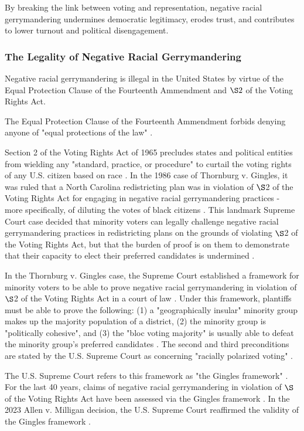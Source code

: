 \documentclass[sn-vancouver,Numbered]{sn-jnl}
\theoremstyle{thmstyleone}%
\theoremstyle{thmstyletwo}%
\theoremstyle{thmstylethree}%
\begin{document}
By breaking the link between voting and representation, negative racial gerrymandering undermines democratic legitimacy, erodes trust, and contributes to lower turnout and political disengagement.

\subsubsection{The Legality of Negative Racial Gerrymandering}
\label{sec:legality}
Negative racial gerrymandering is illegal in the United States by virtue of the Equal Protection Clause of the Fourteenth Ammendment and $\S2$ of the Voting Rights Act. 

The Equal Protection Clause of the Fourteenth Ammendment forbids denying anyone of "equal protections of the law" \cite{USConst14}.

Section 2 of the Voting Rights Act of 1965 precludes states and political entities from wielding any "standard, practice, or procedure" to curtail the voting rights of any U.S. citizen based on race \cite{vra1965_sec2}. In the 1986 case of Thornburg v. Gingles, it was ruled that a North Carolina redistricting plan was in violation of $\S$2 of the Voting Rights Act for engaging in negative racial gerrymandering practices - more specifically, of diluting the votes of black citizens \cite{thornburg1986gingles}. This landmark Supreme Court case decided that minority voters can legally challenge negative racial gerrymandering practices in redistricting plans on the grounds of violating $\S$2 of the Voting Rights Act, but that the burden of proof is on them to demonstrate that their capacity to elect their preferred candidates is undermined \cite{thornburg1986gingles}. 

In the Thornburg v. Gingles case, the Supreme Court established a framework for minority voters to be able to prove negative racial gerrymandering in violation of $\S$2 of the Voting Rights Act in a court of law \cite{thornburg1986gingles}. Under this framework, plantiffs must be able to prove the following: (1) a "geographically insular" minority group makes up the majority population of a district, (2) the minority group is "politically cohesive", and (3) the "bloc voting majority" is usually able to defeat the minority group's preferred candidates \cite{thornburg1986gingles}. The second and third preconditions are stated by the U.S. Supreme Court as concerning "racially polarized voting" \cite{allen_milligan_2023}.

The U.S. Supreme Court refers to this framework as "the Gingles framework" \cite{allen_milligan_2023}. For the last 40 years, claims of negative racial gerrymandering in violation of $\S$ of the Voting Rights Act have been assessed via the Gingles framework \cite{allen_milligan_2023}. In the 2023 Allen v. Milligan decision, the U.S. Supreme Court reaffirmed the validity of the Gingles framework \cite{allen_milligan_2023}.
\end{document}
